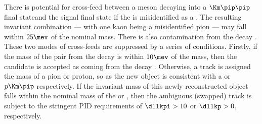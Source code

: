 There is potential for cross-feed between a \Dp meson decaying into a $\Km\pip\pip$ final stateand
the signal \Ds final state if the \pip is misidentified as a \Kp.
The resulting invariant \kkpi combination --- with one kaon being a misidentified pion --- may fall
within $25\mev$ of the nominal \Ds mass.
There is also contamination from the decay .
These two modes of cross-feeds are suppressed by a series of conditions.
Firstly, if the mass of the \kk pair from the \Ds decay is within $10\mev$ of the \phii mass, then
the candidate is accepted as coming from the decay \decay{\Ds}{\kkpi}.
Otherwise, a track is assigned the mass of a pion or proton, so as the new object is consistent
with a \kkpi or $p\Km\pip$ respectively.
If the invariant mass of this newly reconstructed object falls within the nominal mass of the \Dp
or \Lc, then the ambiguous (swapped) track is subject to the stringent PID requirements of
$\dllkpi>10$ or $\dllkp>0$, respectively.






